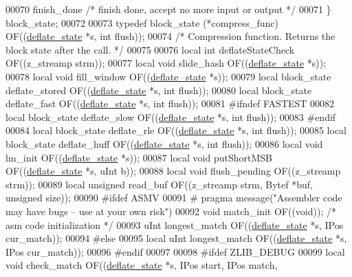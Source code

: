 \begin{DoxyCode}
00070     finish\_done     \textcolor{comment}{/* finish done, accept no more input or output */}
00071 \} block\_state;
00072 
00073 \textcolor{keyword}{typedef} block\_state (*compress\_func) OF((\hyperlink{structinternal__state}{deflate\_state} *s, \textcolor{keywordtype}{int} flush));
00074 \textcolor{comment}{/* Compression function. Returns the block state after the call. */}
00075 
00076 local \textcolor{keywordtype}{int} deflateStateCheck      OF((z\_streamp strm));
00077 local \textcolor{keywordtype}{void} slide\_hash     OF((\hyperlink{structinternal__state}{deflate\_state} *s));
00078 local \textcolor{keywordtype}{void} fill\_window    OF((\hyperlink{structinternal__state}{deflate\_state} *s));
00079 local block\_state deflate\_stored OF((\hyperlink{structinternal__state}{deflate\_state} *s, \textcolor{keywordtype}{int} flush));
00080 local block\_state deflate\_fast   OF((\hyperlink{structinternal__state}{deflate\_state} *s, \textcolor{keywordtype}{int} flush));
00081 \textcolor{preprocessor}{#ifndef FASTEST}
00082 local block\_state deflate\_slow   OF((\hyperlink{structinternal__state}{deflate\_state} *s, \textcolor{keywordtype}{int} flush));
00083 \textcolor{preprocessor}{#endif}
00084 local block\_state deflate\_rle    OF((\hyperlink{structinternal__state}{deflate\_state} *s, \textcolor{keywordtype}{int} flush));
00085 local block\_state deflate\_huff   OF((\hyperlink{structinternal__state}{deflate\_state} *s, \textcolor{keywordtype}{int} flush));
00086 local \textcolor{keywordtype}{void} lm\_init        OF((\hyperlink{structinternal__state}{deflate\_state} *s));
00087 local \textcolor{keywordtype}{void} putShortMSB    OF((\hyperlink{structinternal__state}{deflate\_state} *s, uInt b));
00088 local \textcolor{keywordtype}{void} flush\_pending  OF((z\_streamp strm));
00089 local \textcolor{keywordtype}{unsigned} read\_buf   OF((z\_streamp strm, Bytef *buf, \textcolor{keywordtype}{unsigned} size));
00090 \textcolor{preprocessor}{#ifdef ASMV}
00091 \textcolor{preprocessor}{#  pragma message("Assembler code may have bugs -- use at your own risk")}
00092       \textcolor{keywordtype}{void} match\_init OF((\textcolor{keywordtype}{void})); \textcolor{comment}{/* asm code initialization */}
00093       uInt longest\_match  OF((\hyperlink{structinternal__state}{deflate\_state} *s, IPos cur\_match));
00094 \textcolor{preprocessor}{#else}
00095 local uInt longest\_match  OF((\hyperlink{structinternal__state}{deflate\_state} *s, IPos cur\_match));
00096 \textcolor{preprocessor}{#endif}
00097 
00098 \textcolor{preprocessor}{#ifdef ZLIB\_DEBUG}
00099 local  \textcolor{keywordtype}{void} check\_match OF((\hyperlink{structinternal__state}{deflate\_state} *s, IPos start, IPos match,

\end{DoxyCode}
